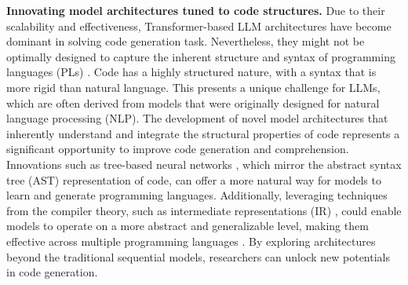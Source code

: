 
\textbf{Innovating model architectures tuned to code structures.}
Due to their scalability and effectiveness, Transformer-based LLM architectures have become dominant in solving code generation task. 
Nevertheless, they might not be optimally designed to capture the inherent structure and syntax of programming languages (PLs) \cite{guo2020graphcodebert,guo2022unixcoder,ma2022code,kou2023model}. Code has a highly structured nature, with a syntax that is more rigid than natural language. This presents a unique challenge for LLMs, which are often derived from models that were originally designed for natural language processing (NLP).
The development of novel model architectures that inherently understand and integrate the structural properties of code represents a significant opportunity to improve code generation and comprehension. Innovations such as tree-based neural networks \cite{mou2014tbcnn}, which mirror the abstract syntax tree (AST) representation of code, can offer a more natural way for models to learn and generate programming languages. Additionally, leveraging techniques from the compiler theory, such as intermediate representations (IR) \cite{li2022unleashing}, could enable models to operate on a more abstract and generalizable level, making them effective across multiple programming languages \cite{paul2024ircoder}. By exploring architectures beyond the traditional sequential models, researchers can unlock new potentials in code generation.


